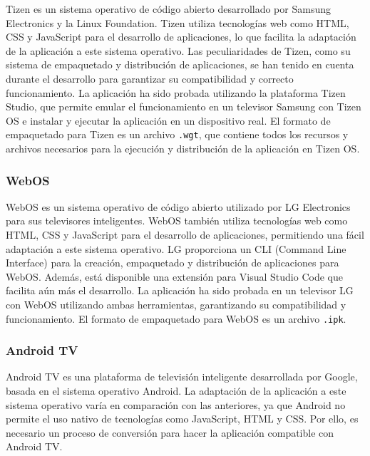 Tizen \cite{Tizen} es un sistema operativo de código abierto desarrollado por Samsung Electronics y la Linux 
Foundation. Tizen utiliza tecnologías web como HTML, CSS y JavaScript para el desarrollo de aplicaciones, lo que 
facilita la adaptación de la aplicación a este sistema operativo. Las peculiaridades de Tizen, como su sistema de 
empaquetado y distribución de aplicaciones, se han tenido en cuenta durante el desarrollo para garantizar su 
compatibilidad y correcto funcionamiento. La aplicación ha sido probada utilizando la plataforma Tizen Studio, 
que permite emular el funcionamiento en un televisor Samsung con Tizen OS e instalar y ejecutar la aplicación 
en un dispositivo real. El formato de empaquetado para Tizen es un archivo \texttt{.wgt}, que contiene todos 
los recursos y archivos necesarios para la ejecución y distribución de la aplicación en Tizen OS.

\subsubsection{WebOS}
\label{subsubsec:adaptabilidad_webos}

WebOS \cite{WebOS} es un sistema operativo de código abierto utilizado por LG Electronics para sus televisores 
inteligentes. WebOS también utiliza tecnologías web como HTML, CSS y JavaScript para el desarrollo de aplicaciones, 
permitiendo una fácil adaptación a este sistema operativo. LG proporciona un CLI (Command Line Interface) para la 
creación, empaquetado y distribución de aplicaciones para WebOS. Además, está disponible una extensión para Visual 
Studio Code que facilita aún más el desarrollo. La aplicación ha sido probada en un televisor LG con WebOS 
utilizando ambas herramientas, garantizando su compatibilidad y funcionamiento. El formato de empaquetado para 
WebOS es un archivo \texttt{.ipk}.

\subsubsection{Android TV}
\label{subsubsec:adaptabilidad_android_tv}

Android TV \cite{AndroidTV} es una plataforma de televisión inteligente desarrollada por Google, basada en el 
sistema operativo Android. La adaptación de la aplicación a este sistema operativo varía en comparación con las 
anteriores, ya que Android no permite el uso nativo de tecnologías como JavaScript, HTML y CSS. Por ello, es 
necesario un proceso de conversión para hacer la aplicación compatible con Android TV.

